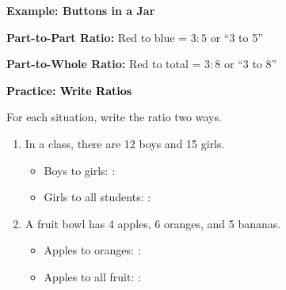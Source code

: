 \documentclass[12pt, letterpaper, fleqn]{article}
\newcommand{\blank}{\underline{\hspace{2.2cm}}}
\begin{document}
\begin{tcolorbox}[colback=white, colframe=black!25, boxrule=0.6pt, arc=4mm, left=6mm, right=6mm, top=5mm, bottom=5mm]

\textbf{Example: Buttons in a Jar}

\medskip

\begin{center}
\end{center}

\medskip

\noindent
\textbf{Part-to-Part Ratio:} Red to blue = $3:5$ or ``3 to 5''

\noindent
\textbf{Part-to-Whole Ratio:} Red to total = $3:8$ or ``3 to 8''

\end{tcolorbox}

\vspace{4mm}

\begin{tcolorbox}[colback=customteal!20]
\large\textcolor{black}{\textbf{Practice: Write Ratios}}
\end{tcolorbox}

\noindent
For each situation, write the ratio two ways.

\vspace{3mm}

\begin{enumerate}[itemsep=1.5cm, leftmargin=0.6cm]

\item In a class, there are 12 boys and 15 girls.
\begin{itemize}
    \item Boys to girls: \blank : \blank
    \item Girls to all students: \blank : \blank
\end{itemize}

\item A fruit bowl has 4 apples, 6 oranges, and 5 bananas.
\begin{itemize}
    \item Apples to oranges: \blank : \blank
    \item Apples to all fruit: \blank : \blank
\end{itemize}

\end{enumerate}
\end{document}
